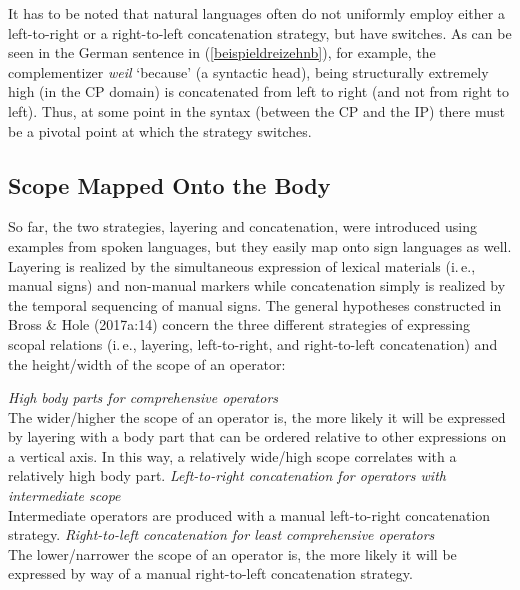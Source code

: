 \noindent It has to be noted that natural languages often do not uniformly employ either a left-to-right or a right-to-left concatenation strategy, but have switches. As can be seen in the German sentence in (\ref{beispieldreizehnb}), for example, the complementizer \textit{weil} `because' (a syntactic head), being structurally extremely high (in the CP domain) is concatenated from left to right (and not from right to left). Thus, at some point in the syntax (between the CP and the IP) there must be a pivotal point at which the strategy switches. 

\subsection{Scope Mapped Onto the Body}
So far, the two strategies, layering and concatenation, were introduced using examples from spoken languages, but they easily map onto sign languages as well. Layering is realized by the simultaneous expression of lexical materials (i.\,e., manual signs) and non-manual markers while concatenation simply is realized by the temporal sequencing of manual signs. The general hypotheses constructed in Bross \& Hole (2017a:14) concern the three different strategies of expressing scopal relations (i.\,e., layering, left-to-right, and right-to-left concatenation) and the height/width of the scope of an operator:



\begin{exe} 
\ex \label{hypohypo} 
\begin{xlist} 
\ex \textit{High body parts for comprehensive operators} \\
The wider/higher the scope of an operator is, the more likely it will be expressed by layering with a body part that can be ordered relative to other expressions on a vertical axis. In this way, a relatively wide/high scope correlates with a relatively high body part.   \label{hypothesisa}
\ex \textit{Left-to-right concatenation for operators with intermediate scope}\\
Intermediate operators are produced with a manual left-to-right concatenation strategy.  \label{hypothesisb} 
\ex  \textit{Right-to-left concatenation for least comprehensive operators} \\
The lower/narrower the scope of an operator is, the more likely it will be expressed by way of a manual right-to-left concatenation strategy. \label{hypothesisc}
\end{xlist} 
\end{exe}


